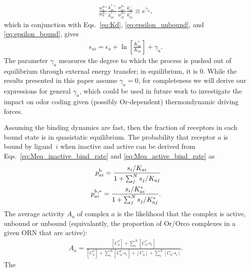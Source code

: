 \documentclass[9pt,twoside]{pnas-new}
\begin{document}
\begin{align}
\frac{w^{\text{u}+}_a}{w^{\text{u}-}_a}\frac{k^{*+}_{ai}}{k^{*-}_{ai}}\frac{w^{\text{b}-}_{ai}}{w^{\text{b}+}_{ai}}\frac{k^{-}_{ai}}{k^{+}_{ai}} \equiv e^{\gamma_a},
\label{eq:detailed_balance}
\end{align}
which in conjunction with Eqs.~\ref{eq:Kd},  \ref{eq:epsilon_unbound}, and \ref{eq:epsilon_bound}, gives
\begin{align}
\epsilon_{ai} = \epsilon_{a} + \ln\left[\frac{K^*_{ai}}{K_{ai}}\right] + \gamma_a.
\label{testing_equation}
\end{align}
The parameter $\gamma_a$ measures the degree to which the process is pushed out of equilibrium through external energy transfer; in equilibrium, it is 0. While the results presented in this paper assume $\gamma_a = 0$, for completeness we will derive our expressions for general $\gamma_a$, which could be used in future work to investigate the impact on odor coding given (possibly Or-dependent) thermondynamic driving forces. 

Assuming the binding dynamics are fast, then the fraction of receptors in each bound state is in quasistatic equilibrium. The probability that receptor $a$ is bound by ligand~$i$ when inactive and active can be derived from  Eqs.~\ref{eq:Meq_inactive_bind_rate} and \ref{eq:Meq_active_bind_rate} as
\begin{align}
p^{\text b}_{ai} = \frac{s_i/K_{ai}}{1 + \sum_j^Ns_j/K_{aj}} \label{eq:bound_prob_ai_inactive} \\
p^{\text b, *}_{ai} = \frac{s_i/K^*_{ai}}{1 + \sum_j^Ns_j/K^*_{aj}} \label{eq:bound_prob_ai_active}.
\end{align}
The average  activity $A_a$ of complex $a$ is the likelihood that the complex is active, unbound or unbound (equivalantly, the proportion of Or/Orco complexes in a given ORN that are active):
\begin{align}
A_a = \frac{[C^*_a] + \sum_i^N[C^*_a\text{-}s_i]}{[C^*_a] + \sum_i^N[C^*_a\text{-}s_i] + {[C_a] + \sum_i^N[C_a\text{-}s_i]}}.
\end{align} 
The 
\end{document}
